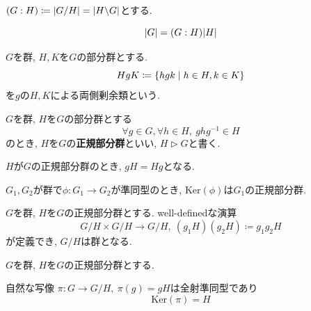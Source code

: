 \begin{theotcolorbox}[title = ラグランジュの定理]
    $ (G:H) \coloneq \qty|G/H| = \qty| H\backslash G|$とする.

    \begin{equation*}
        \qty|G| = (G:H)\qty|H|
    \end{equation*}
\end{theotcolorbox}

\begin{deftcolorbox}[title = 両側剰余類]
    $G$を群, $H, K$を$G$の部分群とする.
    \begin{equation*}
        HgK \coloneq \qty{hgk \mid h \in H, k \in K}
    \end{equation*}
    を$g$の$H, K$による両側剰余類という.
\end{deftcolorbox}

\begin{theotcolorbox}[title = ブリューア分解]
    
\end{theotcolorbox}

\begin{deftcolorbox}[title = 正規部分群]
    $G$を群, $H$を$G$の部分群とする
    \begin{equation*}
        \forall g \in G, \forall h \in H,\ ghg^{-1} \in H
    \end{equation*}
    のとき, $H$を$G$の\textbf{正規部分群}といい, $H \triangleright G$と書く.

    $H$が$G$の正規部分群のとき, $gH = Hg$となる.
\end{deftcolorbox}

\begin{theotcolorbox}
    $G_1, G_2$が群で$\phi: G_1 \rightarrow G_2$が準同型のとき, $\mathrm{Ker}(\phi)$は$G_1$の正規部分群.
\end{theotcolorbox}

\begin{theotcolorbox}
    $G$を群, $H$を$G$の正規部分群とする. well-definedな演算
    \begin{equation*}
        G/H \times G/H \rightarrow G/H,\ (g_1H)(g_2H) \coloneq g_1g_2 H
    \end{equation*}
    が定義でき, $G/H$は群となる.
\end{theotcolorbox}

\begin{theotcolorbox}
    $G$を群, $H$を$G$の正規部分群とする.
    
    自然な写像 $\pi : G \rightarrow G/H,\ \pi(g) = gH$は全射準同型であり
    \begin{equation*}
        \mathrm{Ker}(\pi) = H
    \end{equation*}
\end{theotcolorbox}

